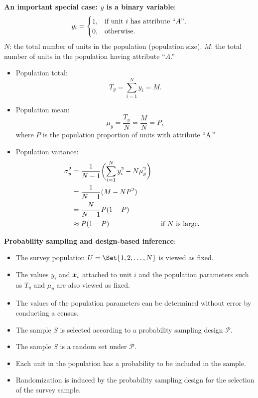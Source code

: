 \textbf{An important special case: $y$ is a binary variable}:
\[ y_i=\begin{cases}
            1, & \text{if unit $ i $ has attribute ``$A$''}, \\
            0, & \text{otherwise}.
      \end{cases} \]
$ N $: the total number of units in the population (population size).
$ M $: the total number of units in the population having attribute ``$A$.''
\begin{itemize}
      \item Population total:
            \[ T_y=\sum_{i=1}^{N}y_i=M. \]
      \item Population mean:
            \[ \mu_y=\frac{T_y}{N}=\frac{M}{N}=P, \]
            where $ P $ is the population proportion of units with attribute ``A.''
      \item Population variance:
            \begin{align*}
                  \sigma_y^2
                   & =\frac{1}{N-1}\biggl(\sum_{i=1}^{N}y_i^2-N\mu_y^2\biggr)                                 \\
                   & =\frac{1}{N-1}(M-NP^2)                                                                   \\
                   & =\frac{N}{N-1}P(1-P)                                                                     \\
                   & \approx P(1-P)                                           &  & \text{ if $ N $ is large}.
            \end{align*}
\end{itemize}

\textbf{Probability sampling and design-based inference}:
\begin{itemize}
      \item The survey population $ U=\Set{1,2,\ldots,N} $ is viewed as fixed.
      \item The values $ y_i $ and $ \bm{x}_i $ attached to unit $ i $
            and the population parameters such as $ T_y $ and $ \mu_y $
            are also viewed as fixed.
      \item The values of the population parameters can be determined without error by conducting
            a census.
      \item The sample $ S $ is selected according to a probability sampling design $ \mathcal{P} $.
      \item The sample $ S $ is a random set under $ \mathcal{P} $.
      \item Each unit in the population has a probability to be included in the
            sample.
      \item Randomization is induced by the probability sampling design for
            the selection of the survey sample.
\end{itemize}

